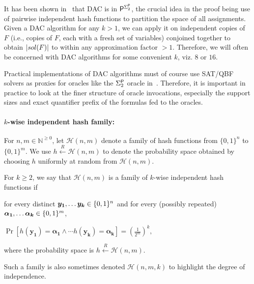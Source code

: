 It has been shown in~\cite{stockmeyer} that DAC is in
$\mathsf{P}^{{\Sigma_2^{\mathsf{P}}}}$, the crucial idea in the proof being use of
pairwise independent hash functions to partition the space of all
assignments.  Given a DAC algorithm for any $k > 1$, we can apply it
on independent copies of $F$ (i.e., copies of $F$, each with a fresh set of variables) conjoined together to obtain $|sol({F})|$ to
within any approximation factor $> 1$. Therefore, we will often be
concerned with DAC algorithms for some convenient $k$, viz. $8$ or
$16$.



Practical implementations of DAC algorithms must of course use SAT/QBF
solvers as proxies for oracles like the ${\Sigma_2^{\mathsf{P}}}$ oracle
in~\cite{stockmeyer}. Therefore, it is important in practice to look
at the finer structure of oracle invocations, especially the support
sizes and exact quantifier prefix of the formulas fed to the oracles.



















\paragraph{\bfseries $k$-wise independent hash family:}

For $n,m\in \mathbb{N}^{\ge 0}$, let $\mathcal{H}(n,m)$ denote a family
of hash functions from $\{0,1\}^n$ to $\{0,1\}^m$. We use
$h \xleftarrow{R} \mathcal{H}(n,m)$ to denote the probability space
obtained by choosing $h$ uniformly at random from
$\mathcal{H}(n,m)$.



\begin{definition}
	For $k \ge 2$, we say that $\mathcal{H}(n,m)$ is a family of
        $k$-wise independent hash functions if
        
	
	
        for every distinct ${\boldsymbol{y_1}}, \ldots {\boldsymbol{y_k}} \in \{0,1\}^n$ and for every (possibly repeated) ${\boldsymbol{\alpha_1}}, \ldots {\boldsymbol{\alpha_k}} \in \{0,1\}^m$,


$		\Pr [ h(\boldsymbol{y_1}) = \boldsymbol{\alpha_1} \wedge  \cdots h(\boldsymbol{y_k}) = \boldsymbol{\alpha_k}] = \left(\frac{1}{2^m}\right)^k,
$

where the probability space is $h \xleftarrow{R} \mathcal{H}(n,m)$.

Such a family is also sometimes denoted $\mathcal{H}(n,m,k)$ to highlight the degree of independence.
\end{definition}	

